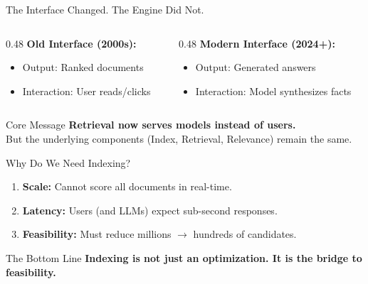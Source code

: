 \documentclass[aspectratio=169]{beamer}
\begin{document}
\begin{frame}{The Interface Changed. The Engine Did Not.}
\begin{columns}[T,onlytextwidth]
\begin{column}{0.48\textwidth}
\textbf{Old Interface (2000s):}
\begin{itemize}
    \item Output: Ranked documents
    \item Interaction: User reads/clicks
\end{itemize}

\begin{center}

\end{center}
\end{column}

\begin{column}{0.48\textwidth}
\textbf{Modern Interface (2024+):}
\begin{itemize}
    \item Output: Generated answers
    \item Interaction: Model synthesizes facts
\end{itemize}

\begin{center}

\end{center}
\end{column}
\end{columns}

\vspace{1em}
\begin{alertblock}{Core Message}
\textbf{Retrieval now serves models instead of users.} \\
But the underlying components (Index, Retrieval, Relevance) remain the same.
\end{alertblock}
\end{frame}

\begin{frame}{Why Do We Need Indexing?}
\begin{enumerate}
    \item \textbf{Scale:} Cannot score all documents in real-time.
    \item \textbf{Latency:} Users (and LLMs) expect sub-second responses.
    \item \textbf{Feasibility:} Must reduce millions $\rightarrow$ hundreds of candidates.
\end{enumerate}

\vspace{1em}

\begin{center}

\end{center}

\vspace{2em}

\begin{exampleblock}{The Bottom Line}
\textbf{Indexing is not just an optimization. It is the bridge to feasibility.}
\end{exampleblock}
\end{frame}
\end{document}
